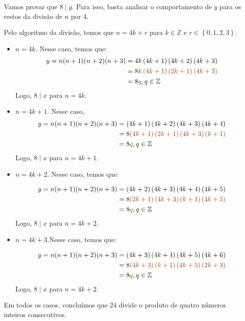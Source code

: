 \documentclass[12pt, a4paper]{article}
\newcommand{\Z}{\mathbb{Z}}
\begin{document}
\begin{solution}
Vamos provar que $8 \mid y$. Para isso, basta analisar o comportamento de $y$ para os restos da divisão de $n$ por $4.$

Pelo algoritmo da divisão, temos que $n=4k+r$  para $k \in \Z$ e  $r \in  \left\{0, 1, 2, 3 \right\}$.

\begin{itemize}
	\item $n=4k.$ Nesse caso, temos que:
	\begin{align*}
	     y=n(n+1)(n+2)(n+3) &= 4k \left( 4k+1 \right)  \left( 4k+2 \right)  \left( 4k+3 \right) \\&= 8 \textcolor{RawSienna}{k\left( 4k+1 \right)  \left( 2k+1 \right)  \left( 4k+3 \right)} \\&= 8\textcolor{RawSienna}{q}, q \in \mathbb{Z}
	\end{align*}
	Logo, $8 \mid x$ para $n = 4k.$
	\item  $n=4k+1.$ Nesse caso,
	\begin{align*}
	     y=n(n+1)(n+2)(n+3) &= \left( 4k+1 \right)  \left( 4k+2 \right)  \left( 4k+3 \right)  \left( 4k+4 \right) \\&= 8 \textcolor{RawSienna}{\left( 4k+1 \right)  \left( 2k+1 \right)  \left( 4k+3 \right)  \left( k+1 \right) } \\&= 8\textcolor{RawSienna}{q}, q \in \mathbb{Z}
	\end{align*}
	Logo, $8 \mid x$ para $n = 4k+1.$	

	\item $n=4k+2.$ Nesse caso, temos que:
	
	\begin{align*}
	     y=n(n+1)(n+2)(n+3) &= \left( 4k+2 \right)  \left( 4k+3 \right)  \left( 4k+4 \right)  \left( 4k+5 \right) \\&= 8 \textcolor{RawSienna}{\left( 2k+1 \right)  \left( 4k+3 \right)  \left( k+1 \right)  \left( 4k+5 \right)  } \\&= 8\textcolor{RawSienna}{q}, q \in \mathbb{Z}
	\end{align*}
	Logo, $8 \mid x$ para $n = 4k+2.$
	
	\item $n=4k+3.$Nesse caso, temos que:
	
	\begin{align*}
	     y=n(n+1)(n+2)(n+3) &=  \left( 4k+3 \right)  \left( 4k+4 \right)  \left( 4k+5 \right)  \left( 4k+6 \right) \\&= 8 \textcolor{RawSienna}{ \left( 4k+3 \right)  \left( k+1 \right)  \left( 4k+5 \right)  \left( 2k+3 \right) } \\&= 8\textcolor{RawSienna}{q}, q \in \mathbb{Z}
	\end{align*}
	Logo, $8 \mid x$ para $n = 4k+2.$
\end{itemize}

Em todos os casos, concluímos que $24$ divide o produto de quatro números inteiros consecutivos.

\end{solution}
\end{document}
